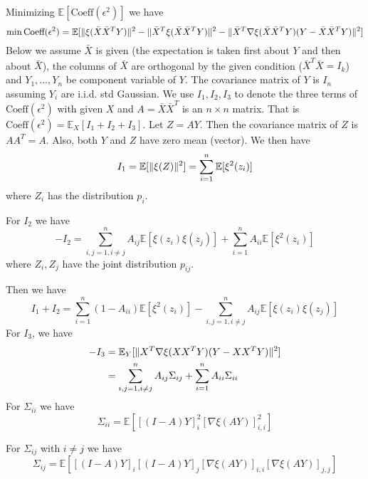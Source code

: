 \documentclass{article}
\DeclarePairedDelimiter\norm{\lVert}{\rVert}
\def\E{\mathbb{E}}
\begin{document}
Minimizing $\E[\textrm{Coeff}(\epsilon^2)]$ we have
\begin{equation}
\min \textrm{Coeff}(\epsilon^2) = \E[\norm{\xi(\bar{X}\bar{X}^TY)}^2 - \norm{\bar{X}^T\xi(\bar{X}\bar{X}^TY)}^2 - \norm{\bar{X}^T \nabla\xi(\bar{X}\bar{X}^TY)(Y-\bar{X}\bar{X}^TY)}^2]
\end{equation}
Below we assume $\bar{X}$ is given (the expectation is taken first about $Y$ and then about $\bar{X}$), the columns of $\bar{X}$ are orthogonal by the given condition ($\bar{X}^T\bar{X}=I_k$) and $Y_1, \dots, Y_n $ be component variable of $Y$. The covariance matrix of $Y$ is $I_n$ assuming $Y_i$ are i.i.d. std Gaussian. We use $I_1, I_2, I_3$ to denote the three terms of $\textrm{Coeff}(\epsilon^2)$ with given $X$ and $A=\bar{X}\bar{X}^T$ is an $n\times n$ matrix. That is $ \textrm{Coeff}(\epsilon^2) = \E_{X} [I_1 + I_2 + I_3]$.
Let $Z = AY$. Then the covariance matrix of $Z$ is $AA^T = A$.
Also, both $Y$ and $Z$ have zero mean (vector). We then have
\begin{equation*}
I_1 =\E[\norm{\xi(Z)}^2] = \sum_{i=1}^n \E[\xi^2(z_i)]
\end{equation*}
where $Z_i$ has the distribution $p_i$.
 
For $I_2$
we have
\begin{equation*}
-I_2   = \sum_{i,j=1, i \neq j}^n A_{ij}\E[\xi(z_i)\xi(z_j)] + \sum_{i=1}^n A_{ii}  \E[\xi^2(z_i)]
\end{equation*}
where $Z_i, Z_j$ have the joint distribution $p_{ij}$.

Then we have
\begin{equation}\label{eq:I1plusI2}
I_1+ I_2 =   \sum_{i=1}^n (1-A_{ii}) \E[\xi^2(z_i)]  - \sum_{i,j=1, i \neq j}^n A_{ij}\E[\xi(z_i)\xi(z_j)] 
\end{equation}
For $I_3$, we have
\begin{align*}
-I_3 & = \E_Y[\norm{X^T \nabla\xi(XX^TY)(Y-XX^TY)}^2] \\ 
 & = \sum_{i,j=1, i \neq j}^n A_{ij}\Sigma_{ij} + \sum_{i=1}^n A_{ii}\Sigma_{ii} 
\end{align*}
For $\Sigma_{ii}$ we have
\begin{equation}\label{eq:sigmaii}
\Sigma_{ii} =  \E[ [(I-A)Y]_i^2 [\nabla \xi(AY)]_{i,i}^2]
\end{equation}

For $\Sigma_{ij}$ with $i\neq j$ we have
\begin{equation*}
\Sigma_{ij} =  \E[ [(I-A)Y]_i [(I-A)Y]_j [\nabla \xi(AY)]_{i,i} [\nabla \xi(AY)]_{j,j}]
\end{equation*}
\end{document}

